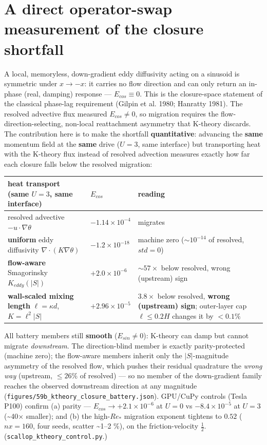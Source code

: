 \documentclass[tc, manuscript]{copernicus}
\begin{document}
\section{A direct operator-swap measurement of the closure shortfall}

A local, memoryless, down-gradient eddy diffusivity acting on a sinusoid is symmetric under $x\to -x$: it carries no flow direction and can only return an in-phase (real, damping) response — $E_{cos}\equiv 0$. This is the closure-space statement of the classical phase-lag requirement (Gilpin et al. 1980; Hanratty 1981). The resolved advective flux measured $E_{cos}\ne 0$, so migration requires the flow-direction-selecting, non-local reattachment asymmetry that K-theory discards. The contribution here is to make the shortfall \textbf{quantitative}: advancing the \textbf{same} momentum field at the \textbf{same} drive ($U=3$, same interface) but transporting heat with the K-theory flux instead of resolved advection measures exactly how far each closure falls below the resolved migration:

\begin{center}\small
\begin{tabularx}{\linewidth}{>{\raggedright\arraybackslash}X>{\raggedright\arraybackslash}X>{\raggedright\arraybackslash}X}
\hline
heat transport (same $U=3$, same interface) & $E_{cos}$ & reading \\
\hline
resolved advective $-u\cdot \nabla \theta $ & $-1.14\times 10^{-4}$ & migrates \\
\textbf{uniform} eddy diffusivity $\nabla \cdot (K\nabla \theta )$ & $-1.2\times 10^{-18}$ & machine zero ($\sim 10^{-14}$ of resolved, $std=0$) \\
\textbf{flow-aware} Smagorinsky $K_{eddy}(|S|)$ & $+2.0\times 10^{-6}$ & $\sim 57\times $ below resolved, wrong (upstream) sign \\
\textbf{wall-scaled mixing length} $\ell =\kappa d$, $K=\ell ^{2}|S|$ & $+2.96\times 10^{-5}$ & $3.8\times $ below resolved, \textbf{wrong (upstream) sign}; outer-layer cap $\ell \le 0.2H$ changes it by $<0.1\%$ \\
\hline
\end{tabularx}
\end{center}

All battery members still \textbf{smooth} ($E_{sin}\ne 0$): K-theory can damp but cannot migrate \emph{downstream}. The direction-blind member is exactly parity-protected (machine zero); the flow-aware members inherit only the $|S|$-magnitude asymmetry of the resolved flow, which pushes their residual quadrature the \emph{wrong way} (upstream, $\le 26\%$ of resolved) — so no member of the down-gradient family reaches the observed downstream direction at any magnitude (\texttt{figures/\allowbreak{}59b\_\allowbreak{}ktheory\_\allowbreak{}closure\_\allowbreak{}battery.json}). GPU/CuPy controls (Tesla P100) confirm (a) parity — $E_{cos}\to +2.1\times 10^{-6}$ at $U=0$ vs $-8.4\times 10^{-5}$ at $U=3$ (\textasciitilde{}40\ensuremath{\times} smaller); and (b) the high-$Re_*$ migration exponent tightens to \textbf{$0.52$} ($nx=160$, four seeds, scatter \textasciitilde{}1–2 \%), on the friction-velocity $\tfrac{1}{2}$. (\texttt{scallop\_\allowbreak{}ktheory\_\allowbreak{}control.\allowbreak{}py}.)
\end{document}
